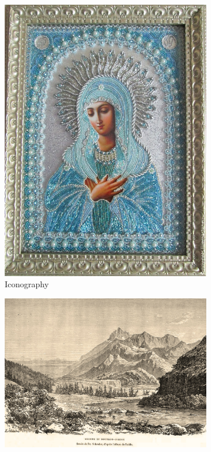 \begin{figure}[htp]
\begin{subfigure}[t]{0.3\textwidth}
        \includegraphics[width=\linewidth]{imagenes/dataset_examples/iconography.jpg}
        \caption*{Iconography}
    \end{subfigure}
    \begin{subfigure}[t]{0.3\textwidth}
        \centering
        \includegraphics[width=\linewidth]{imagenes/dataset_examples/engraving.jpg}

\end{subfigure}
\end{figure}
